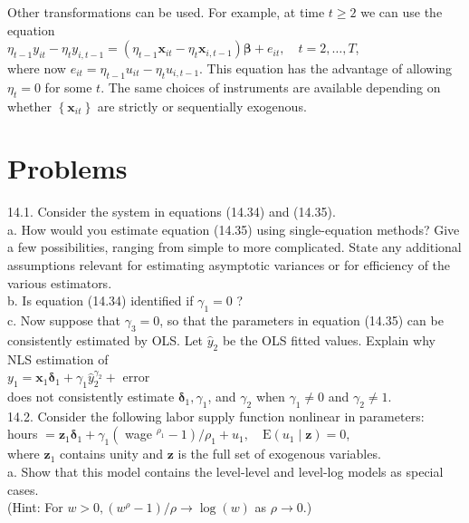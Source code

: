 \documentclass[10pt]{article}
\begin{document}
Other transformations can be used. For example, at time $t \geq 2$ we can use the equation\\
$\eta_{t-1} y_{i t}-\eta_{t} y_{i, t-1}=\left(\eta_{t-1} \mathbf{x}_{i t}-\eta_{t} \mathbf{x}_{i, t-1}\right) \boldsymbol{\beta}+e_{i t}, \quad t=2, \ldots, T$,\\
where now $e_{i t}=\eta_{t-1} u_{i t}-\eta_{t} u_{i, t-1}$. This equation has the advantage of allowing $\eta_{t}=0$ for some $t$. The same choices of instruments are available depending on whether $\left\{\mathbf{x}_{i t}\right\}$ are strictly or sequentially exogenous.

\section*{Problems}
14.1. Consider the system in equations (14.34) and (14.35).\\
a. How would you estimate equation (14.35) using single-equation methods? Give a few possibilities, ranging from simple to more complicated. State any additional\\
assumptions relevant for estimating asymptotic variances or for efficiency of the various estimators.\\
b. Is equation (14.34) identified if $\gamma_{1}=0$ ?\\
c. Now suppose that $\gamma_{3}=0$, so that the parameters in equation (14.35) can be consistently estimated by OLS. Let $\hat{y}_{2}$ be the OLS fitted values. Explain why NLS estimation of\\
$y_{1}=\mathbf{x}_{1} \boldsymbol{\delta}_{1}+\gamma_{1} \hat{y}_{2}^{\gamma_{2}}+$ error\\
does not consistently estimate $\boldsymbol{\delta}_{1}, \gamma_{1}$, and $\gamma_{2}$ when $\gamma_{1} \neq 0$ and $\gamma_{2} \neq 1$.\\
14.2. Consider the following labor supply function nonlinear in parameters:\\
hours $=\mathbf{z}_{1} \boldsymbol{\delta}_{1}+\gamma_{1}\left(\right.$ wage $\left.^{\rho_{1}}-1\right) / \rho_{1}+u_{1}, \quad \mathrm{E}\left(u_{1} \mid \mathbf{z}\right)=0$,\\
where $\mathbf{z}_{1}$ contains unity and $\mathbf{z}$ is the full set of exogenous variables.\\
a. Show that this model contains the level-level and level-log models as special cases.\\
(Hint: For $w>0,\left(w^{\rho}-1\right) / \rho \rightarrow \log (w)$ as $\rho \rightarrow 0$.)\\
\end{document}
